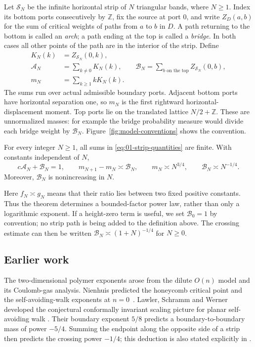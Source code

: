 Let $\mathcal S_N$ be the infinite horizontal strip of $N$ triangular
bands, where $N\ge1$. Index its bottom ports consecutively by $\mathbb Z$,
fix the source at port $0$, and write $Z_D(a,b)$ for the sum of critical
weights of paths from $a$ to $b$ in $D$. A path returning to the bottom
is called an \emph{arch}; a path ending at the top is called a
\emph{bridge}. In both cases all other points of the path are in the
interior of the strip. Define
\begin{equation}\label{eq:01-strip-quantities}
 \begin{split}
 K_N(k)&=Z_{\mathcal S_N}(0,k),\\
 \mathcal A_N&=\sum_{k\ne0}K_N(k),\qquad
 \mathcal B_N=\sum_{b\text{ on the top}}Z_{\mathcal S_N}(0,b),\\
 m_N&=\sum_{k\ge1}kK_N(k).
 \end{split}
\end{equation}
The sums run over actual admissible boundary ports. Adjacent bottom
ports have horizontal separation one, so $m_N$ is the first rightward
horizontal-displacement moment. Top ports lie on the translated lattice
$N/2+\mathbb Z$. These are unnormalized masses: for example the bridge
probability measure would divide each bridge weight by $\mathcal B_N$.
Figure~\ref{fig:model-conventions} shows the convention.




\begin{theorem}\label{thm:strip}
For every integer $N\ge1$, all sums in
\eqref{eq:01-strip-quantities} are finite. With constants independent of
$N$,
\begin{equation}\label{eq:01-strip-result}
 c\mathcal A_N+\mathcal B_N=1,\qquad
 m_{N+1}-m_N\asymp\mathcal B_N,\qquad
 m_N\asymp N^{3/4},\qquad
 \mathcal B_N\asymp N^{-1/4}.
\end{equation}
Moreover, $\mathcal B_N$ is nonincreasing in $N$.
\end{theorem}
Here $f_N\asymp g_N$ means that their ratio lies between two fixed
positive constants. Thus the theorem determines a bounded-factor
power law, rather than only a logarithmic exponent. If a height-zero
term is useful, we set $\mathcal B_0=1$ by convention; no strip path is
being added to the definition above. The crossing estimate can then be
written $\mathcal B_N\asymp(1+N)^{-1/4}$ for $N\ge0$.

\subsection{Earlier work}
The two-dimensional polymer exponents arose from the dilute $O(n)$
model and its Coulomb-gas analysis. Nienhuis predicted the honeycomb
critical point and the self-avoiding-walk exponents at
$n=0$~\cite{Nienhuis1982}.
Lawler, Schramm and Werner developed the conjectural conformally
invariant scaling picture for planar self-avoiding walk
\cite[Sections~3.3.1, 3.4.3 and~4.1]{LawlerSchrammWerner2004}.
Their boundary exponent $5/8$ predicts a boundary-to-boundary mass
of power $-5/4$. Summing the endpoint along the opposite side of a
strip then predicts the crossing power $-1/4$; this deduction is
also stated explicitly in \cite[Section~4]{DCS2012}.

